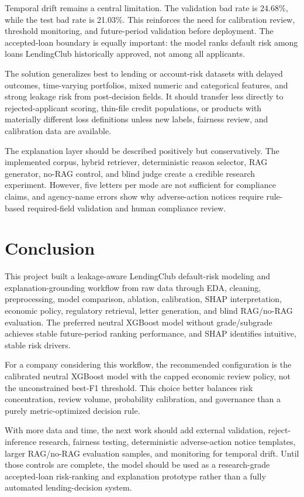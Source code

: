 \documentclass[11pt]{article}
\begin{document}
Temporal drift remains a central limitation. The validation bad rate is 24.68\%, while the test bad rate is 21.03\%. This reinforces the need for calibration review, threshold monitoring, and future-period validation before deployment. The accepted-loan boundary is equally important: the model ranks default risk among loans LendingClub historically approved, not among all applicants.

The solution generalizes best to lending or account-risk datasets with delayed outcomes, time-varying portfolios, mixed numeric and categorical features, and strong leakage risk from post-decision fields. It should transfer less directly to rejected-applicant scoring, thin-file credit populations, or products with materially different loss definitions unless new labels, fairness review, and calibration data are available.

The explanation layer should be described positively but conservatively. The implemented corpus, hybrid retriever, deterministic reason selector, RAG generator, no-RAG control, and blind judge create a credible research experiment. However, five letters per mode are not sufficient for compliance claims, and agency-name errors show why adverse-action notices require rule-based required-field validation and human compliance review.

\section{Conclusion}
This project built a leakage-aware LendingClub default-risk modeling and explanation-grounding workflow from raw data through EDA, cleaning, preprocessing, model comparison, ablation, calibration, SHAP interpretation, economic policy, regulatory retrieval, letter generation, and blind RAG/no-RAG evaluation. The preferred neutral XGBoost model without grade/subgrade achieves stable future-period ranking performance, and SHAP identifies intuitive, stable risk drivers.

For a company considering this workflow, the recommended configuration is the calibrated neutral XGBoost model with the capped economic review policy, not the unconstrained best-F1 threshold. This choice better balances risk concentration, review volume, probability calibration, and governance than a purely metric-optimized decision rule.

With more data and time, the next work should add external validation, reject-inference research, fairness testing, deterministic adverse-action notice templates, larger RAG/no-RAG evaluation samples, and monitoring for temporal drift. Until those controls are complete, the model should be used as a research-grade accepted-loan risk-ranking and explanation prototype rather than a fully automated lending-decision system.
\end{document}
